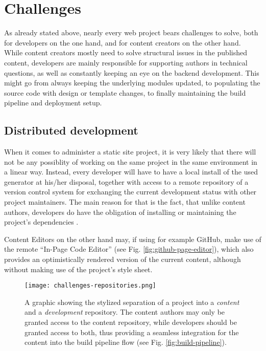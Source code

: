 \section{Challenges}
\label{sec:challenges}

As already stated above, nearly every web project bears challenges to solve, both for developers on the one hand, and for content creators on the other hand. While content creators mostly need to solve structural issues in the published content, developers are mainly responsible for supporting authors in technical questions, as well as constantly keeping an eye on the backend development. This might go from always keeping the underlying modules updated, to populating the source code with design or template changes, to finally maintaining the build pipeline and deployment setup.

\subsection{Distributed development}
\label{sec:challenges-distributeddevelopment}

When it comes to administer a static site project, it is very likely that there will not be any possiblity of working on the same project in the same environment in a linear way. Instead, every developer will have to have a local install of the used generator at his/her disposal, together with access to a remote repository of a version control system for exchanging the current development status with other project maintainers. The main reason for that is the fact, that unlike content authors, developers do have the obligation of installing or maintaining the project's dependencies \cite[85]{dhillon2016}.

Content Editors on the other hand may, if using for example GitHub, make use of the remote ``In-Page Code Editor'' (see Fig. \ref{fig:github-page-editor}), which also provides an optimistically rendered version of the current content, although without making use of the project's style sheet.
\begin{figure} %
    \centering
    \texttt{[image: challenges-repositories.png]}
    \caption{A graphic showing the stylized separation of a project into a \emph{content} and a \emph{development} repository. The content authors may only be granted access to the content repository, while developers should be granted access to both, thus providing a seamless integration for the content into the build pipeline flow (see Fig. \ref{fig:build-pipeline}).}
    \label{fig:repository-separation}
\end{figure}
%

